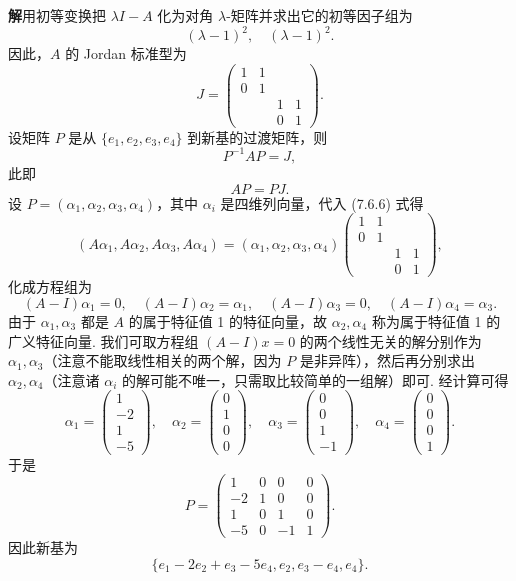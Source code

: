 \documentclass[UTF8,12pt,a4paper,fontset=fandol]{ctexart}
\begin{document}
\noindent\textbf{解}\quad 用初等变换把 $\lambda I-A$ 化为对角 $\lambda$-矩阵并求出它的初等因子组为
\[
(\lambda-1)^2,\quad(\lambda-1)^2.
\]
因此，$A$ 的 Jordan 标准型为
\[
J=\left(\begin{array}{cccc}
1 & 1 & & \\
0 & 1 & & \\
& & 1 & 1\\
& & 0 & 1
\end{array}\right).
\]
设矩阵 $P$ 是从 $\{e_1,e_2,e_3,e_4\}$ 到新基的过渡矩阵，则
\[
P^{-1}AP=J,
\]
此即
\begin{equation}
AP=PJ.
\tag{7.6.6}
\end{equation}
设 $P=(\alpha_1,\alpha_2,\alpha_3,\alpha_4)$，其中 $\alpha_i$ 是四维列向量，代入 (7.6.6) 式得
\[
(A\alpha_1,A\alpha_2,A\alpha_3,A\alpha_4)
=(\alpha_1,\alpha_2,\alpha_3,\alpha_4)
\left(\begin{array}{cccc}
1 & 1 & & \\
0 & 1 & & \\
& & 1 & 1\\
& & 0 & 1
\end{array}\right),
\]
化成方程组为
\[
(A-I)\alpha_1=0,\quad
(A-I)\alpha_2=\alpha_1,\quad
(A-I)\alpha_3=0,\quad
(A-I)\alpha_4=\alpha_3.
\]
由于 $\alpha_1,\alpha_3$ 都是 $A$ 的属于特征值 1 的特征向量，故 $\alpha_2,\alpha_4$ 称为属于特征值 1 的广义特征向量. 我们可取方程组 $(A-I)x=0$ 的两个线性无关的解分别作为 $\alpha_1,\alpha_3$（注意不能取线性相关的两个解，因为 $P$ 是非异阵），然后再分别求出 $\alpha_2,\alpha_4$（注意诸 $\alpha_i$ 的解可能不唯一，只需取比较简单的一组解）即可. 经计算可得
\[
\alpha_1=\left(\begin{array}{c}
1\\
-2\\
1\\
-5
\end{array}\right),\quad
\alpha_2=\left(\begin{array}{c}
0\\
1\\
0\\
0
\end{array}\right),\quad
\alpha_3=\left(\begin{array}{c}
0\\
0\\
1\\
-1
\end{array}\right),\quad
\alpha_4=\left(\begin{array}{c}
0\\
0\\
0\\
1
\end{array}\right).
\]
于是
\[
P=\left(\begin{array}{cccc}
1 & 0 & 0 & 0\\
-2 & 1 & 0 & 0\\
1 & 0 & 1 & 0\\
-5 & 0 & -1 & 1
\end{array}\right).
\]
因此新基为
\[
\{e_1-2e_2+e_3-5e_4,e_2,e_3-e_4,e_4\}.
\]
\end{document}
